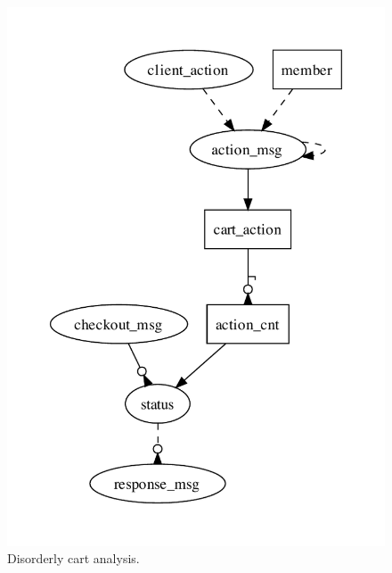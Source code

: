 \begin{figure}[t]
\centering
\includegraphics[width=0.7\linewidth]{fig/disorderly.pdf}
\vspace{-10pt}
\caption{Disorderly cart analysis.}
\label{fig:pdg-disorderly-analysis}
\vspace{-2pt}
\end{figure}


